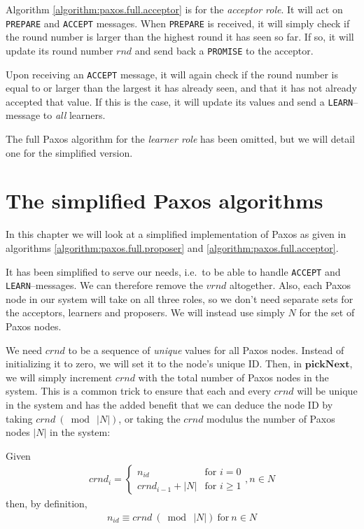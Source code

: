Algorithm \ref{algorithm:paxos.full.acceptor}
 is for the \textit{acceptor
role}.  It will act on \texttt{PREPARE} and \texttt{ACCEPT} messages.
When \texttt{PREPARE} is received, it will simply check if the round number
is larger than the highest round it has seen so far.  If so, it will update
its round number $rnd$ and send back a \texttt{PROMISE} to the acceptor.

Upon receiving an \texttt{ACCEPT} message, it will again check if the round
number is equal to or larger than the largest it has already seen, and that
it has not already accepted that value.  If this is the case, it will update
its values and send a \texttt{LEARN}--message to \textit{all} learners.

The full Paxos algorithm for the \textit{learner role} has been omitted, but
we will detail one for the simplified version.

\clearpage
\section{The simplified Paxos algorithms}
\label{ch:simplifying.paxos}

In this chapter we will look at a simplified implementation of Paxos as
given in algorithms \ref{algorithm:paxos.full.proposer} and
\ref{algorithm:paxos.full.acceptor}.

It has been simplified to serve our needs, i.e.~to be able to handle
\texttt{ACCEPT} and \texttt{LEARN}--messages.  We can therefore remove the
$vrnd$ altogether.  Also, each Paxos node in our system will take on all
three roles, so we don't need separate sets for the acceptors, learners and
proposers. We will instead use simply $N$ for the set of Paxos nodes.

We need $crnd$ to be a sequence of \textit{unique} values for all Paxos
nodes.
Instead of initializing it to zero, we will set it to the node's
unique ID.  Then, in $\textbf{pickNext}$, we will simply increment $crnd$
with the total number of Paxos nodes in the system.  This
is a common trick to ensure that each and every $crnd$ will be unique in the
system and has
the added benefit that we can deduce the node ID by taking
$crnd\ (\bmod\ |N|)$, or taking the $crnd$ modulus the number of Paxos nodes
$|N|$ in the system:

Given
\begin{gather}
  crnd_i = \left\{
             \begin{array}{ll}
               n_{id} & \mbox{for } i = 0 \\
               crnd_{i-1} + |N| & \mbox{for } i \geq 1
             \end{array}
           \right. , n \in N
  \label{equation:crnd_i}
\end{gather}
then, by definition,
\begin{gather}
  n_{id} \equiv crnd\ (\bmod\ |N|)\ \text{for}\ n \in N
  \label{equation:crnd_mod_N}
\end{gather}

